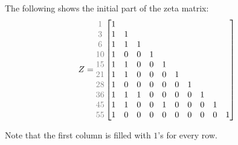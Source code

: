 \documentclass{amsart}
\theoremstyle{definition}
\newcommand{\NN}{\mathbb{N}}
\newcommand{\leqtri}{\leq_{\tri}}
\newcommand{\tri}{\mathcal T}
\begin{document}
The following shows the initial part of the zeta matrix:
\begin{equation}\label{eq:zeta-10}
    Z = {\color{gray}\begin{matrix}
        1 \\3 \\6 \\10 \\15 \\ 
        21 \\ 28 \\ 36 \\ 45 \\ 55
    \end{matrix}}
    \begin{bmatrix}
    1 \\
    1 & 1 \\
    1 & 1 & 1 \\
    1 & 0 & 0 & 1 \\
    1 & 1 & 0 & 0 & 1 \\
    1 & 1 & 0 & 0 & 0 & 1 \\
    1 & 0 & 0 & 0 & 0 & 0 & 1 \\
    1 & 1 & 1 & 0 & 0 & 0 & 0 & 1 \\
    1 & 1 & 0 & 0 & 1 & 0 & 0 & 0 & 1 \\
    1 & 0 & 0 & 0 & 0 & 0 & 0 & 0 & 0 & 1
    \end{bmatrix}
\end{equation}

Note that the first column %
is filled with $1$'s for every row. 

\end{document}
